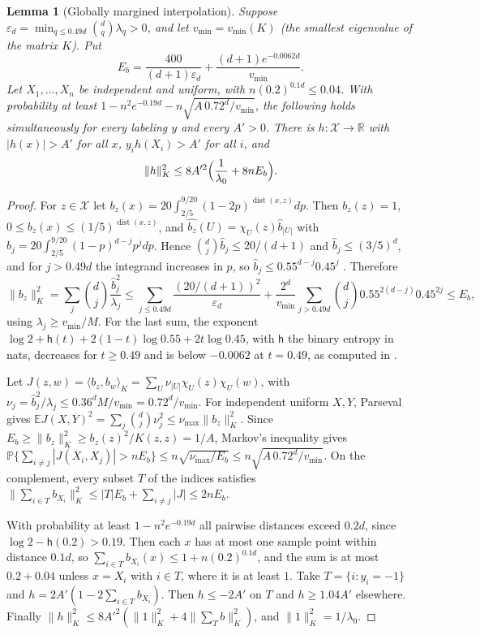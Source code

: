 \documentclass[11pt]{article}
\newtheorem{lemma}[theorem]{Lemma}
\theoremstyle{definition}\newtheorem{assumption}[theorem]{Assumption}
\theoremstyle{remark}\newtheorem{remark}[theorem]{Remark}
\DeclareMathOperator{\dist}{dist}
\newcommand{\E}{\mathbb E}
\newcommand{\Pp}{\mathbb P}
\newcommand{\X}{\mathcal X}
\newcommand{\R}{\mathbb R}
\begin{document}
\begin{lemma}[Globally margined interpolation]\label{lem:bump}
Suppose $\varepsilon_d=\min_{q\le0.49d}\binom dq\lambda_q>0$, and let
$v_{\min}=v_{\min}(K)$ (the smallest eigenvalue of the matrix $K$). Put
\[
 E_b=\frac{400}{(d+1)\varepsilon_d}+\frac{(d+1)e^{-0.0062d}}{v_{\min}} .
\]
Let $X_1,\ldots,X_n$ be independent and uniform, with $n(0.2)^{0.1d}\le0.04$.
With probability at least $1-n^2e^{-0.19d}-n\sqrt{A\,0.72^d/v_{\min}}$, the
following holds simultaneously for every labeling $y$ and every $A'>0$.
There is $h:\X\to\R$ with $|h(x)|>A'$ for all $x$, $y_ih(X_i)>A'$ for all
$i$, and
\[
 \|h\|_K^2\le8A'^2\Bigl(\frac1{\lambda_0}+8nE_b\Bigr).
\]
\end{lemma}
\begin{proof}
For $z\in\X$ let $b_z(x)=20\int_{2/5}^{9/20}(1-2p)^{\dist(x,z)}dp$. Then
$b_z(z)=1$, $0\le b_z(x)\le(1/5)^{\dist(x,z)}$, and
$\widehat{b_z}(U)=\chi_U(z)\widehat b_{|U|}$ with
$\widehat b_j=20\int_{2/5}^{9/20}(1-p)^{d-j}p^jdp$. Hence
$\binom dj\widehat b_j\le20/(d+1)$ and $\widehat b_j\le(3/5)^d$, and for
$j>0.49d$ the integrand increases in $p$, so
$\widehat b_j\le0.55^{d-j}0.45^j$ \cite[proof of Lemma~7.2]{subcritical}.
Therefore
\[
 \|b_z\|_K^2=\sum_j\binom dj\frac{\widehat b_j^2}{\lambda_j}
 \le\sum_{j\le0.49d}\frac{(20/(d+1))^2}{\varepsilon_d}
 +\frac{2^d}{v_{\min}}\sum_{j>0.49d}\binom dj0.55^{2(d-j)}0.45^{2j}
 \le E_b,
\]
using $\lambda_j\ge v_{\min}/M$. For the last sum, the exponent
$\log2+\mathsf h(t)+2(1-t)\log0.55+2t\log0.45$, with $\mathsf h$ the binary
entropy in nats, decreases for $t\ge0.49$ and is below $-0.0062$ at
$t=0.49$, as computed in \cite[proof of Lemma~7.2]{subcritical}.

Let $J(z,w)=\langle b_z,b_w\rangle_K=\sum_U\nu_{|U|}\chi_U(z)\chi_U(w)$, with
$\nu_j=\widehat b_j^2/\lambda_j\le0.36^dM/v_{\min}=0.72^d/v_{\min}$. For independent
uniform $X,Y$, Parseval gives
$\E J(X,Y)^2=\sum_j\binom dj\nu_j^2\le\nu_{\max}\|b_z\|_K^2$. Since
$E_b\ge\|b_z\|_K^2\ge b_z(z)^2/K(z,z)=1/A$, Markov's inequality gives
$\Pp\{\sum_{i\ne j}|J(X_i,X_j)|>nE_b\}\le n\sqrt{\nu_{\max}/E_b}\le
n\sqrt{A\,0.72^d/v_{\min}}$. On the complement, every subset $T$ of the indices
satisfies $\|\sum_{i\in T}b_{X_i}\|_K^2\le|T|E_b+\sum_{i\ne j}|J|\le2nE_b$.

With probability at least $1-n^2e^{-0.19d}$ all pairwise distances exceed
$0.2d$, since $\log2-\mathsf h(0.2)>0.19$. Then each $x$ has at most one
sample point within distance $0.1d$, so
$\sum_{i\in T}b_{X_i}(x)\le1+n(0.2)^{0.1d}$, and the sum is at most
$0.2+0.04$ unless $x=X_i$ with $i\in T$, where it is at least $1$. Take
$T=\{i:y_i=-1\}$ and $h=2A'(1-2\sum_{i\in T}b_{X_i})$. Then $h\le-2A'$ on
$T$ and $h\ge1.04A'$ elsewhere. Finally
$\|h\|_K^2\le8A'^2(\|1\|_K^2+4\|\sum_Tb\|_K^2)$, and
$\|1\|_K^2=1/\lambda_0$.
\end{proof}
\end{document}
